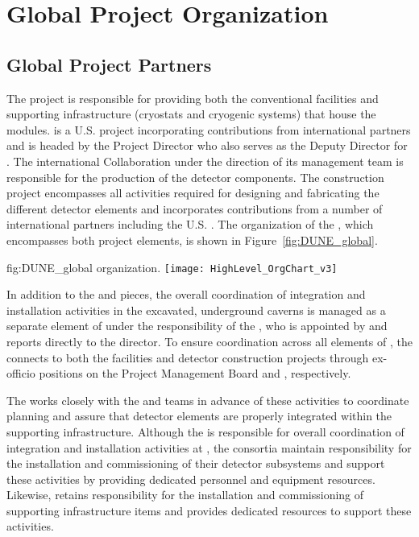 \chapter{Global Project Organization}
\label{vl:tc-global}

\section{Global Project Partners}
\label{sec:partners}

The  project is responsible for providing both the 
conventional facilities and supporting infrastructure (cryostats 
and cryogenic systems) that house the   
modules.  is a U.S.  project incorporating 
contributions from international partners and is headed by the 
 Project Director who also serves as the  
Deputy Director for .  The international  
Collaboration under the direction of its management team is 
responsible for the production of the detector components.  The 
  construction project encompasses all 
activities required for designing and fabricating the different 
detector elements and incorporates contributions from a number 
of international partners including the U.S. .  The 
organization of the , which encompasses 
both project elements, is shown in Figure~\ref{fig:DUNE_global}.
\begin{dunefigure}{fig:DUNE_global}
  { organization.}
  \texttt{[image: HighLevel\_OrgChart\_v3]}
\end{dunefigure}

In addition to the  and  pieces, the 
overall coordination of integration and installation activities 
in the excavated, underground caverns is managed as a separate
element of  under the responsibility of 
the , who is appointed by and reports directly to the 
 director.  To ensure coordination 
across all elements of , the  connects 
to both the facilities and detector construction projects through 
ex-officio positions on the  Project Management Board 
and  , respectively.

The  works closely with the  and 
teams in advance of these activities to coordinate planning
and assure that detector elements are properly integrated within the 
supporting infrastructure.  Although the  is responsible 
for overall coordination of integration and installation activities
at , the  consortia maintain responsibility 
for the installation and commissioning of their detector subsystems
and support these activities by providing dedicated personnel and
equipment resources.  Likewise,  retains responsibility
for the installation and commissioning of supporting infrastructure
items and provides dedicated resources to support these activities.          

